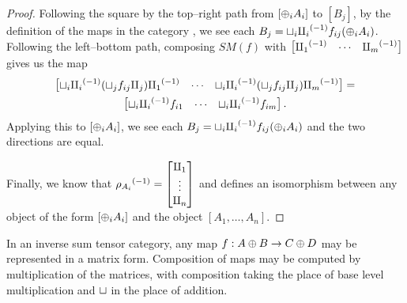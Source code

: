 \begin{proof}
  Following the square by the top--right path from $[\oplus_i A_i]$ to $[B_j]$, by the definition of
  the maps in the category \imatx, we see each $B_j = \sqcup_i{\amalg_{i}}^{(-1)} f_{ij}(\oplus_i A_i)$.
  Following the left--bottom path, composing $SM(f)$ with $\begin{bmatrix}{\amalg_{1}}^{(-1)}& \cdots
  &{\amalg_{m}}^{(-1)}\end{bmatrix}$ gives us the map
  \begin{multline*}
    \begin{bmatrix}\sqcup_i {\amalg_{i}}^{(-1)} (\sqcup_j f_{ij}\amalg_{j}){\amalg_{1}}^{(-1)}& \cdots
      &\sqcup_i {\amalg_{i}}^{(-1)} (\sqcup_j f_{ij}\amalg_{j}){\amalg_{m}}^{(-1)}\end{bmatrix} = \\
      \begin{bmatrix}\sqcup_i {\amalg_{i}}^{(-1)}  f_{i 1}& \cdots &\sqcup_i {\amalg_{i}}^{(-1)} f_{i m}\end{bmatrix}.
  \end{multline*}
  Applying this to $[\oplus_i A_i]$, we see each $B_j = \sqcup_i{\amalg_{i}}^{(-1)} f_{ij}(\oplus_i A_i)$ and the
  two directions are equal.

  Finally, we know that ${\rho_{A_i}}^{(-1)} = \begin{bmatrix}\amalg_{1}\\ \vdots \\\amalg_{n}\end{bmatrix}$
  and defines an isomorphism between any object of the form $[\oplus_i A_i]$ and the
  object $[A_1,\ldots,A_n]$.
\end{proof}
\begin{lemma}\label{lem:inverse_sum_category_maps_are_matrices}
  In an inverse sum tensor category, any map $f:A\oplus B \to C\oplus D$ may be represented in a matrix form.
  Composition of maps may be computed by multiplication of the matrices, with composition taking
  the place of base level multiplication and $\sqcup$ in the place of addition.
\end{lemma}
